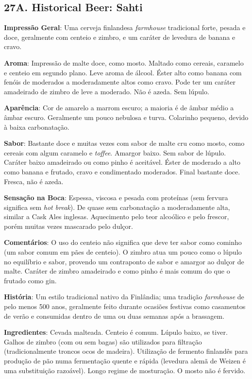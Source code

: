 \subsection*{27A. Historical Beer: Sahti}
\textbf{Impressão Geral}: Uma cerveja finlandesa \textit{farmhouse} tradicional forte, pesada e doce, geralmente com centeio e zimbro, e um caráter de levedura de banana e cravo.

\textbf{Aroma}: Impressão de malte doce, como mosto. Maltado como cereais, caramelo e centeio em segundo plano. Leve aroma de álcool. Éster alto como banana com fenóis de moderados a moderadamente altos como cravo. Pode ter um caráter amadeirado de zimbro de leve a moderado. Não é azeda. Sem lúpulo.

\textbf{Aparência}: Cor de amarelo a marrom escuro; a maioria é de âmbar médio a âmbar escuro. Geralmente um pouco nebulosa e turva. Colarinho pequeno, devido à baixa carbonatação.

\textbf{Sabor}: Bastante doce e muitas vezes com sabor de malte cru como mosto, como cereais com algum caramelo e \textit{toffee}. Amargor baixo. Sem sabor de lúpulo. Caráter baixo amadeirado ou como pinho é aceitável. Éster de moderado a alto como banana e frutado, cravo e condimentado moderados. Final bastante doce. Fresca, não é azeda.

\textbf{Sensação na Boca}: Espessa, viscosa e pesada com proteínas (sem fervura significa sem \textit{hot break}). De quase sem carbonatação a moderadamente alta, similar a Cask Ales inglesas. Aquecimento pelo teor alcoólico e pelo frescor, porém muitas vezes mascarado pelo dulçor.

\textbf{Comentários}: O uso do centeio não significa que deve ter sabor como cominho (um sabor comum em pães de centeio). O zimbro atua um pouco como o lúpulo no equilíbrio e sabor, provendo um contraponto de sabor e amargor ao dulçor de malte. Caráter de zimbro amadeirado e como pinho é mais comum do que o frutado como gin.

\textbf{História}: Um estilo tradicional nativo da Finlândia; uma tradição \textit{farmhouse} de pelo menos 500 anos, geralmente feito durante ocasiões festivas como casamentos de verão e consumidas dentro de uma ou duas semanas após a brassagem.

\textbf{Ingredientes}: Cevada malteada. Centeio é comum. Lúpulo baixo, se tiver. Galhos de zimbro (com ou sem bagas) são utilizados para filtração (tradicionalmente troncos ocos de madeira). Utilização de fermento finlandês para produção de pão numa fermentação quente e rápida (levedura alemã de Weizen é uma substituição razoável). Longo regime de mosturação. O mosto não é fervido.


